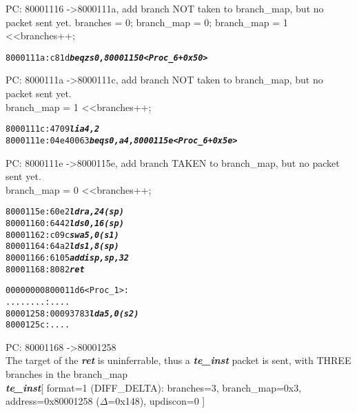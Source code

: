 \begin{enumerate}
  \begin {frame}

    PC: 80001116 -\textgreater 8000111a, add branch NOT taken to branch\_map, but no packet sent yet.
    branches = 0; branch\_map = 0;
    branch\_map \textbar= 1 \textless\textless branches++;
  \end{frame}
  

  \begin {alltt}
    8000111a:	c81d                    \textbf{\textit{beqz	s0,80001150 <Proc\_6+0x50>}}
  \end{alltt}
  
  \begin {frame}

  PC: 8000111a -\textgreater 8000111c, add branch NOT taken to branch\_map, but no packet sent yet.\\
  branch\_map \textbar= 1 \textless\textless branches++;
  \end{frame}
  

  \begin {alltt}
    8000111c:   4709                    \textbf{\textit{li      a4,2}}
    8000111e:   04e40063                \textbf{\textit{beq     s0,a4,8000115e <Proc\_6+0x5e>}}
  \end{alltt}
  
  \begin {frame}

  PC: 8000111e -\textgreater 8000115e, add branch TAKEN to branch\_map, but no packet sent yet.\\
  branch\_map \textbar= 0 \textless\textless branches++;
  \end{frame}
  

  \begin {alltt}
    8000115e:	60e2                	\textbf{\textit{ld	ra,24(sp)}}
    80001160:	6442                	\textbf{\textit{ld	s0,16(sp)}}
    80001162:	c09c                	\textbf{\textit{sw	a5,0(s1)}}
    80001164:	64a2                	\textbf{\textit{ld	s1,8(sp)}}
    80001166:	6105                	\textbf{\textit{addi	sp,sp,32}}
    80001168:	8082                	\textbf{\textit{ret}}
  
00000000800011d6 <Proc\_1>:
    ........:   ....
    80001258:	00093783          	\textbf{\textit{ld	a5,0(s2)}}
    8000125c:	....
  \end{alltt}


  \begin {frame}

  PC: 80001168 -\textgreater 80001258\\
  The target of the \textbf{\textit{ret}} is uninferrable, thus a \textbf{\textit{te\_inst}} packet is sent, with THREE branches in the branch\_map\\
  \textbf{\textit{te\_inst}}[ format=1 (DIFF\_DELTA): branches=3, branch\_map=0x3, address=0x80001258 ($\Delta$=0x148), updiscon=0 ]
  \end{frame}
  

\end{enumerate}
